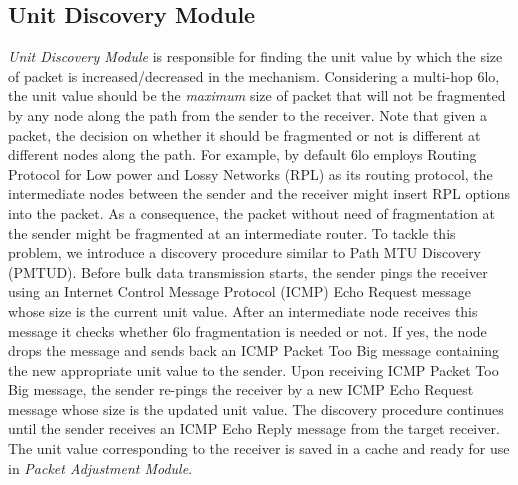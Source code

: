 \documentclass[runningheads,a4paper]{llncs}
\begin{document}
\subsection{Unit Discovery Module}
\emph{Unit Discovery Module} is responsible for finding the unit value by which the size of packet is increased/decreased in the mechanism. Considering a multi-hop 6lo, the unit value should be the \emph{maximum} size of packet that will not be fragmented by any node along the path from the sender to the receiver. Note that given a packet, the decision on whether it should be fragmented or not is different at different nodes along the path. For example, by default 6lo employs Routing Protocol for Low power and Lossy Networks (RPL) as its routing protocol, the intermediate nodes between the sender and the receiver might insert RPL options into the packet. As a consequence, the packet without need of fragmentation at the sender might be fragmented at an intermediate router. To tackle this problem, we introduce a discovery procedure similar to Path MTU Discovery (PMTUD). Before bulk data transmission starts, the sender pings the receiver using an Internet Control Message Protocol (ICMP) Echo Request message whose size is the current unit value. After an intermediate node receives this message it checks whether 6lo fragmentation is needed or not. If yes, the node drops the message and sends back an ICMP Packet Too Big message containing the new appropriate unit value to the sender. Upon receiving ICMP Packet Too Big message, the sender re-pings the receiver by a new ICMP Echo Request message whose size is the updated unit value. The discovery procedure continues until the sender receives an ICMP Echo Reply message from the target receiver. The unit value corresponding to the receiver is saved in a cache and ready for use in \emph{Packet Adjustment Module}.
\end{document}
